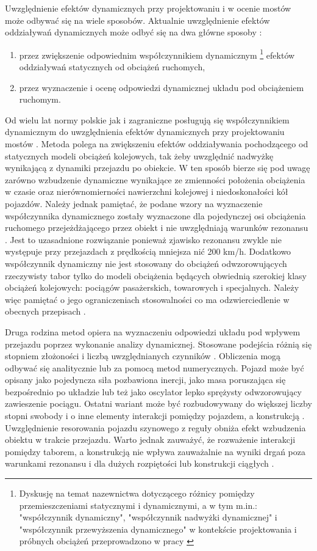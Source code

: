 Uwzględnienie efektów dynamicznych przy projektowaniu i w ocenie mostów może odbywać się na wiele sposobów. Aktualnie uwzględnienie efektów oddziaływań dynamicznych może odbyć się na dwa główne sposoby \parencite{Goicolea2008a}:
\begin{enumerate}
	\item przez zwiększenie odpowiednim współczynnikiem dynamicznym
	\footnote{Dyskusję na temat nazewnictwa dotyczącego różnicy pomiędzy przemieszczeniami statycznymi i dynamicznymi, a w tym m.in.: "współczynnik dynamiczny", "współczynnik nadwyżki dynamicznej" i "współczynnik przewyższenia dynamicznego" w kontekście projektowania i próbnych obciążeń przeprowadzono w pracy \parencite{Poprawa2018}} 
	efektów oddziaływań statycznych od obciążeń ruchomych,
	\item przez wyznaczenie i ocenę odpowiedzi dynamicznej układu pod obciążeniem ruchomym.
\end{enumerate}

Od wielu lat normy polskie jak i zagraniczne posługują się współczynnikiem dynamicznym do uwzględnienia efektów dynamicznych przy projektowaniu mostów \parencite{Karas2011}. Metoda polega na zwiększeniu efektów oddziaływania pochodzącego od statycznych modeli obciążeń kolejowych, tak żeby uwzględnić nadwyżkę wynikającą z dynamiki przejazdu po obiekcie. W ten sposób bierze się pod uwagę zarówno wzbudzenie dynamiczne wynikające ze zmienności położenia obciążenia w czasie oraz nierównomierności nawierzchni kolejowej i niedoskonałości kół pojazdów. Należy jednak pamiętać, że podane wzory na wyznaczenie współczynnika dynamicznego zostały wyznaczone dla pojedynczej osi obciążenia ruchomego przejeżdżającego przez obiekt i nie uwzględniają warunków rezonansu \parencite{Goicolea2008}. Jest to uzasadnione rozwiązanie ponieważ zjawisko rezonansu zwykle nie występuje przy przejazdach z prędkością mniejsza nić 200 km/h. Dodatkowo współczynnik dynamiczny nie jest stosowany do obciążeń odwzorowujących rzeczywisty tabor tylko do modeli obciążenia będących obwiednią szerokiej klasy obciążeń kolejowych: pociągów pasażerskich, towarowych i specjalnych. Należy więc pamiętać o jego ograniczeniach stosowalności co ma odzwierciedlenie w obecnych przepisach \parencite{PKNj}. 

Druga rodzina metod opiera na wyznaczeniu odpowiedzi układu pod wpływem przejazdu poprzez wykonanie analizy dynamicznej. Stosowane podejścia różnią się stopniem złożoności i liczbą uwzględnianych czynników \parencite{Goicolea2008a}. Obliczenia mogą odbywać się analitycznie lub za pomocą metod numerycznych. Pojazd może być opisany jako pojedyncza siła pozbawiona inercji, jako masa poruszająca się bezpośrednio po układzie lub też jako oscylator lepko sprężysty odwzorowujący zawieszenie pociągu. Ostatni wariant może być rozbudowywany do większej liczby stopni swobody i o inne elementy interakcji pomiędzy pojazdem, a konstrukcją \parencite{Calcada2008,Szafranski2013,Szafranski2021}. Uwzględnienie resorowania pojazdu szynowego z reguły obniża efekt wzbudzenia obiektu w trakcie przejazdu. Warto jednak zauważyć, że rozważenie interakcji pomiędzy taborem, a konstrukcją nie wpływa zauważalnie na wyniki drgań poza warunkami rezonansu i dla dużych rozpiętości lub konstrukcji ciągłych \parencite{Goicolea2008a}.

